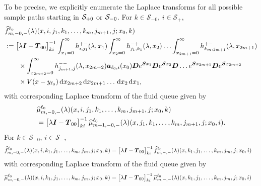 To be precise, we explicitly enumerate the Laplace transforms for all possible sample paths starting in \(\mathcal{S}_{+0}\) or \(\mathcal{S}_{-0}\). For \(k\in\mathcal S_{-0}\), \(i\in\mathcal S_+\),
\begin{align}
	&\widehat{f}_{m,-0,-}^{\ell_0}(\lambda)(x,i,j_1,k_1,\dots,k_m,j_{m+1},j;x_0,k)\nonumber 
	\\&:=\begin{bmatrix} \lambda \boldsymbol I - \boldsymbol T_{00} \end{bmatrix}^{-1}_{ki}\int_{x_1=0}^\infty h^{+-}_{i,j_{1}}(\lambda,x_1)\nonumber
	\int_{x_2=0}^\infty h^{-+}_{j_1,k_1}(\lambda,x_2)
	\hdots \int_{x_{2m+1}=0}^\infty h^{+-}_{k_{m},j_{m+1}}(\lambda, x_{2m+1}) 
	\\&\qquad \times\int_{x_{2m+2}=0}^\infty h^{--}_{j_{m+1},j}(\lambda,x_{2m+2})
	 \boldsymbol   a_{\ell_0,i}(x_0)\boldsymbol De^{\boldsymbol{S}x_1} \boldsymbol{D} e^{\boldsymbol{S}x_2} \boldsymbol{D}\dots e^{\boldsymbol{S}x_{2m+1}}  \boldsymbol{D}e^{\boldsymbol{S}x_{2m+2}} \nonumber 
	 \\&\qquad{}\times V(x-y_{\ell_0})  \, \mathrm{d} x_{2m+2} \, \mathrm{d} x_{2m+1}\dots\, \mathrm{d} x_2 \, \mathrm{d} x_1,\label{eqn: k0jJ0AAAAA}
\end{align}
with corresponding Laplace transform of the fluid queue given by
\begin{align}
	&\widehat \mu_{m,-0,-}^{\ell_0}(\lambda)(x,i,j_1,k_1,\dots,k_m,j_{m+1},j;x_0,k)\nonumber 
	\\& = \begin{bmatrix} \lambda \boldsymbol I - \boldsymbol T_{00} \end{bmatrix}^{-1}_{ki} \widehat \mu_{m+1,-0,-}^{\ell_0}(\lambda)(x,j_1,k_1,\dots,k_m,j_{m+1},j;x_0,i) .
\end{align}
For \(k\in\mathcal S_{-0}\), \(i\in\mathcal S_-\),
\begin{align}
		&\widehat{f}_{m,-0,-}^{\ell_0}(\lambda)(x,i,k_1,j_1,\dots,k_m,j_m,j;x_0,k) 
		=\vligne{\lambda \bs I - \bs T_{00}}^{-1}_{ki}\widehat{f}_{m,-,-}^{\ell_0}(\lambda)(x,k_1,j_1,\dots,k_m,j_m,j;x_0,i)
		\label{eqn: k0jJ0asfc134}%
\end{align} 
with corresponding Laplace transform of the fluid queue given by 
\begin{align}
	&\widehat \mu_{m,-0,-}^{\ell_0}(\lambda)(x,i,k_1,j_1,\dots,k_m,j_m,j;x_0,k)\nonumber 
	= \begin{bmatrix} \lambda \boldsymbol I - \boldsymbol T_{00} \end{bmatrix}^{-1}_{ki}\widehat \mu_{m,-,-}^{\ell_0}(\lambda)(x,k_1,j_1,\dots,k_m,j_m,j;x_0,i)
\end{align}
